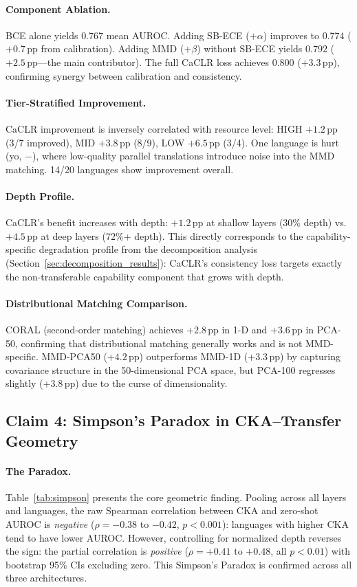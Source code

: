 \documentclass[11pt,a4paper]{article}
\newcommand{\pp}{\,\text{pp}}
\newcommand{\caclr}{CaCLR}
\begin{document}
\paragraph{Component Ablation.}
BCE alone yields $0.767$ mean AUROC. Adding SB-ECE ($+\alpha$) improves to $0.774$ ($+0.7\pp$ from calibration). Adding MMD ($+\beta$) without SB-ECE yields $0.792$ ($+2.5\pp$---the main contributor). The full \caclr{} loss achieves $0.800$ ($+3.3\pp$), confirming synergy between calibration and consistency.

\paragraph{Tier-Stratified Improvement.}
\caclr{} improvement is inversely correlated with resource level: HIGH $+1.2\pp$ (3/7 improved), MID $+3.8\pp$ (8/9), LOW $+6.5\pp$ (3/4).
One language is hurt (yo, $-$), where low-quality parallel translations introduce noise into the MMD matching.
14/20 languages show improvement overall.

\paragraph{Depth Profile.}
\caclr{}'s benefit increases with depth: $+1.2\pp$ at shallow layers (30\% depth) vs.\ $+4.5\pp$ at deep layers (72\%+ depth).
This directly corresponds to the capability-specific degradation profile from the decomposition analysis (Section~\ref{sec:decomposition_results}): \caclr{}'s consistency loss targets exactly the non-transferable capability component that grows with depth.

\paragraph{Distributional Matching Comparison.}
CORAL (second-order matching) achieves $+2.8\pp$ in 1-D and $+3.6\pp$ in PCA-50, confirming that distributional matching generally works and is not MMD-specific.
MMD-PCA50 ($+4.2\pp$) outperforms MMD-1D ($+3.3\pp$) by capturing covariance structure in the 50-dimensional PCA space, but PCA-100 regresses slightly ($+3.8\pp$) due to the curse of dimensionality.


\subsection{Claim 4: Simpson's Paradox in CKA--Transfer Geometry}
\label{sec:cka}

\paragraph{The Paradox.}
Table~\ref{tab:simpson} presents the core geometric finding.
Pooling across all layers and languages, the raw Spearman correlation between CKA and zero-shot AUROC is \emph{negative} ($\rho = -0.38$ to $-0.42$, $p{<}0.001$): languages with higher CKA tend to have lower AUROC.
However, controlling for normalized depth reverses the sign: the partial correlation is \emph{positive} ($\rho = +0.41$ to $+0.48$, all $p{<}0.01$) with bootstrap 95\% CIs excluding zero.
This Simpson's Paradox is confirmed across all three architectures.
\end{document}
